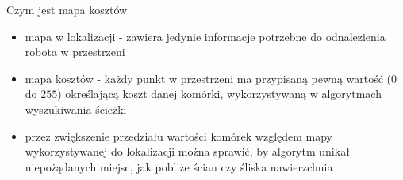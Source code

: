 
\begin{frame}{Czym jest mapa kosztów}
	\begin{itemize}
		\item mapa w lokalizacji - zawiera jedynie informacje potrzebne do odnalezienia robota w przestrzeni
		\item mapa kosztów - każdy punkt w przestrzeni ma przypisaną pewną wartość ($0$ do $255$) określającą koszt danej komórki, wykorzystywaną w algorytmach wyszukiwania ścieżki \cite{costmap}
		\item przez zwiększenie przedziału wartości komórek względem mapy wykorzystywanej do lokalizacji można sprawić, by algorytm unikał niepożądanych miejsc, jak pobliże ścian czy śliska nawierzchnia
	\end{itemize}
\end{frame}

